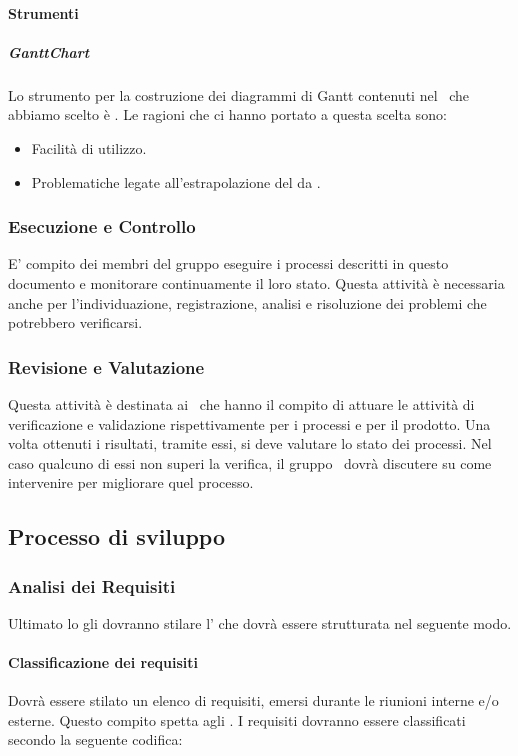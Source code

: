 \paragraph{Strumenti}

\subparagraph{GanttChart}
Lo strumento per la costruzione dei diagrammi di Gantt contenuti nel \PdP\ che abbiamo scelto è .
Le ragioni che ci hanno portato a questa scelta sono:

\begin{itemize}
\item Facilità di utilizzo.
\item Problematiche legate all'estrapolazione del  da .
\end{itemize}

\subsubsection{Esecuzione e Controllo}
E' compito dei membri del gruppo eseguire i processi descritti in questo documento e monitorare continuamente il loro stato. Questa attività è necessaria anche per l'individuazione, registrazione, analisi e risoluzione dei problemi che potrebbero verificarsi.

\subsubsection{Revisione e Valutazione}
Questa attività è destinata ai \Ver\ che hanno il compito di attuare le attività di verificazione e validazione rispettivamente per i processi e per il prodotto. Una volta ottenuti i risultati, tramite essi, si deve valutare lo stato dei processi. Nel caso qualcuno di essi non superi la verifica, il gruppo \gruppo\ dovrà discutere su come intervenire per migliorare quel processo.

\subsection{Processo di sviluppo}
\subsubsection{Analisi dei Requisiti}
Ultimato lo \textit{\SdF} gli \textit{\AnP} dovranno stilare l'\textit{\AdR} che dovrà 	essere strutturata nel seguente modo.
\paragraph{Classificazione dei requisiti}
Dovrà essere stilato un elenco di requisiti, emersi durante le riunioni interne
e/o esterne. Questo compito spetta agli \textit{\AnP}. I requisiti dovranno
essere classificati secondo la seguente codifica:

